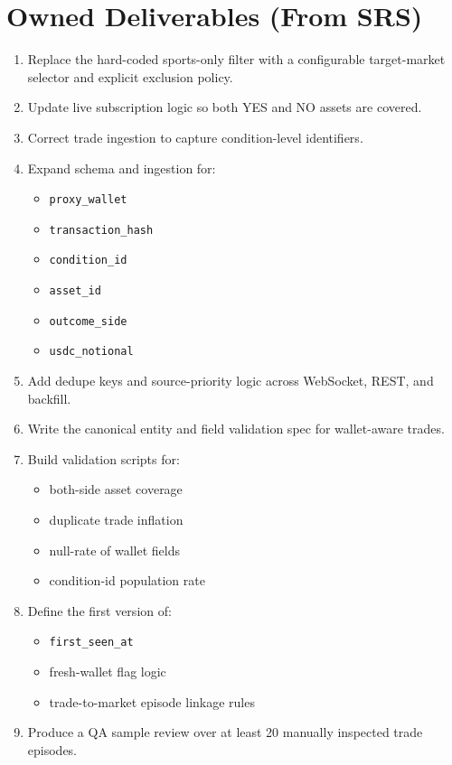 \documentclass{article}
\begin{document}
\section*{Owned Deliverables (From SRS)}
\begin{enumerate}
\item Replace the hard-coded sports-only filter with a configurable target-market selector and explicit exclusion policy.
\item Update live subscription logic so both YES and NO assets are covered.
\item Correct trade ingestion to capture condition-level identifiers.
\item Expand schema and ingestion for:
\begin{itemize}
\item \texttt{proxy\_wallet}
\item \texttt{transaction\_hash}
\item \texttt{condition\_id}
\item \texttt{asset\_id}
\item \texttt{outcome\_side}
\item \texttt{usdc\_notional}
\end{itemize}
\item Add dedupe keys and source-priority logic across WebSocket, REST, and backfill.
\item Write the canonical entity and field validation spec for wallet-aware trades.
\item Build validation scripts for:
\begin{itemize}
\item both-side asset coverage
\item duplicate trade inflation
\item null-rate of wallet fields
\item condition-id population rate
\end{itemize}
\item Define the first version of:
\begin{itemize}
\item \texttt{first\_seen\_at}
\item fresh-wallet flag logic
\item trade-to-market episode linkage rules
\end{itemize}
\item Produce a QA sample review over at least 20 manually inspected trade episodes.
\end{enumerate}
\end{document}
